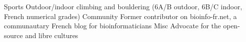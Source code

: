 
\begin{cvskills}

\cvskill
    {Sports} %
    {Outdoor/indoor climbing and bouldering (6A/B outdoor, 6B/C indoor, French numerical grades)} %
\cvskill
    {Community} %
    {Former contributor on bioinfo-fr.net, a communautary French blog for bioinformaticians} %
\cvskill
    {Misc} %
    {Advocate for the open-source and libre cultures} %

\end{cvskills}